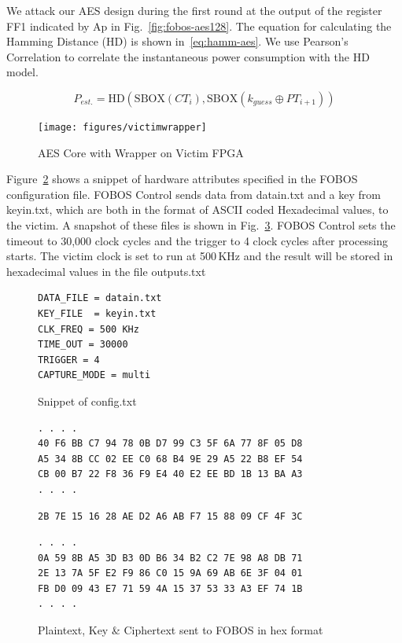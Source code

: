 \documentclass{llncs}
\numberwithin{algorithm}{chapter}
\begin{document}
We attack our AES design during the first round at the output of the register \textsf{FF1} 
indicated by \textsf{Ap} in Fig.~\ref{fig:fobos-aes128}.
The equation for calculating the Hamming Distance (HD) is shown 
in~\ref{eq:hamm-aes}. We use Pearson's Correlation to correlate the instantaneous
power consumption with the HD model. 

\begin{equation}\label{eq:hamm-aes}%
P_{est.} = \mathrm{HD}(\mathrm{SBOX}(CT_{i}), \mathrm{SBOX}(k_{guess} \oplus PT_{i+1}))
\end{equation}


\begin{figure}[ht]
\begin{center}
\texttt{[image: figures/victimwrapper]}
\caption{\label{fig:fobos-vicaes128}AES Core with Wrapper on Victim FPGA}
\end{center} 
\vspace{-3ex}
\end{figure}

Figure~\ref{fig:fobos-hardattb} shows a snippet of hardware attributes
specified in the FOBOS configuration file. FOBOS Control sends data from datain.txt 
and a key from keyin.txt, which are both in
the format of ASCII coded Hexadecimal values, to the victim. A snapshot of these files
is shown in Fig.~\ref{fig:fobos-iof}. FOBOS Control sets the timeout
to 30,000 clock cycles and the trigger to 4 clock cycles after processing starts.
The victim clock is set to run at 500\,KHz and the result will be 
stored in hexadecimal values in the file outputs.txt

\begin{figure}[ht]
\begin{Verbatim}[frame=single]
DATA_FILE = datain.txt
KEY_FILE  = keyin.txt
CLK_FREQ = 500 KHz 
TIME_OUT = 30000
TRIGGER = 4
CAPTURE_MODE = multi
\end{Verbatim}
\caption{\label{fig:fobos-hardattb}Snippet of config.txt}
\end{figure}


\begin{figure}[H]
\begin{Verbatim}[frame=single]
. . . .
40 F6 BB C7 94 78 0B D7 99 C3 5F 6A 77 8F 05 D8 
A5 34 8B CC 02 EE C0 68 B4 9E 29 A5 22 B8 EF 54 
CB 00 B7 22 F8 36 F9 E4 40 E2 EE BD 1B 13 BA A3
. . . .
\end{Verbatim}
\begin{Verbatim}[frame=single]
2B 7E 15 16 28 AE D2 A6 AB F7 15 88 09 CF 4F 3C
\end{Verbatim}
\begin{Verbatim}[frame=single]
. . . .
0A 59 8B A5 3D B3 0D B6 34 B2 C2 7E 98 A8 DB 71 
2E 13 7A 5F E2 F9 86 C0 15 9A 69 AB 6E 3F 04 01 
FB D0 09 43 E7 71 59 4A 15 37 53 33 A3 EF 74 1B 
. . . .
\end{Verbatim}
\caption{\label{fig:fobos-iof}Plaintext, Key \& Ciphertext sent to FOBOS in hex format}
\end{figure}
\end{document}
